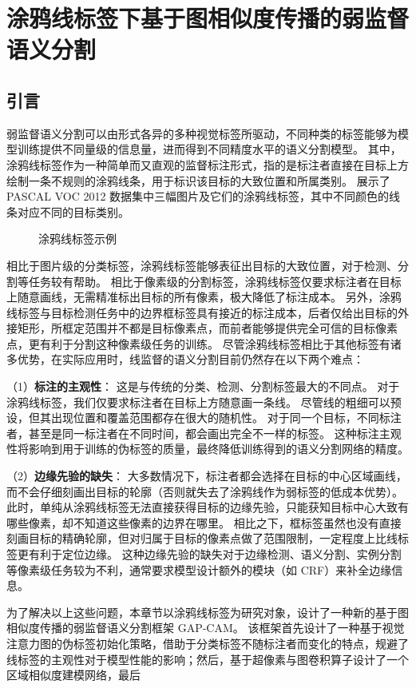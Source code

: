 \chapter{涂鸦线标签下基于图相似度传播的弱监督语义分割}
\section{引言}
弱监督语义分割可以由形式各异的多种视觉标签所驱动，不同种类的标签能够为模型训练提供不同量级的信息量，进而得到不同精度水平的语义分割模型。
其中，涂鸦线标签作为一种简单而又直观的监督标注形式，指的是标注者直接在目标上方绘制一条不规则的涂鸦线条，用于标识该目标的大致位置和所属类别。
展示了 PASCAL VOC 2012 数据集中三幅图片及它们的涂鸦线标签，其中不同颜色的线条对应不同的目标类别。
\par
\begin{figure}[h]
\centering
{}
\hfil
{}
\hfil
{}
\caption{涂鸦线标签示例}
\label{fig:scribble-samples}
\end{figure}
\par
相比于图片级的分类标签，涂鸦线标签能够表征出目标的大致位置，对于检测、分割等任务较有帮助。
相比于像素级的分割标签，涂鸦线标签仅要求标注者在目标上随意画线，无需精准标出目标的所有像素，极大降低了标注成本。
另外，涂鸦线标签与目标检测任务中的边界框标签具有接近的标注成本，后者仅给出目标的外接矩形，所框定范围并不都是目标像素点，而前者能够提供完全可信的目标像素点，更有利于分割这种像素级任务的训练。
尽管涂鸦线标签相比于其他标签有诸多优势，在实际应用时，线监督的语义分割目前仍然存在以下两个难点：
\par
（1）\textbf{标注的主观性}：
这是与传统的分类、检测、分割标签最大的不同点。
对于涂鸦线标签，我们仅要求标注者在目标上方随意画一条线。
尽管线的粗细可以预设，但其出现位置和覆盖范围都存在很大的随机性。
对于同一个目标，不同标注者，甚至是同一标注者在不同时间，都会画出完全不一样的标签。
这种标注主观性将影响到用于训练的伪标签的质量，最终降低训练得到的语义分割网络的精度。
\par
（2）\textbf{边缘先验的缺失}：
大多数情况下，标注者都会选择在目标的中心区域画线，而不会仔细刻画出目标的轮廓（否则就失去了涂鸦线作为弱标签的低成本优势）。
此时，单纯从涂鸦线标签无法直接获得目标的边缘先验，只能获知目标中心大致有哪些像素，却不知道这些像素的边界在哪里。
相比之下，框标签虽然也没有直接刻画目标的精确轮廓，但对归属于目标的像素点做了范围限制，一定程度上比线标签更有利于定位边缘。
这种边缘先验的缺失对于边缘检测、语义分割、实例分割等像素级任务较为不利，通常要求模型设计额外的模块（如 CRF\cite{krahenbuhl2011efficient}）来补全边缘信息。
\par
为了解决以上这些问题，本章节以涂鸦线标签为研究对象，设计了一种新的基于图相似度传播的弱监督语义分割框架 GAP-CAM。
该框架首先设计了一种基于视觉注意力图的伪标签初始化策略，借助于分类标签不随标注者而变化的特点，规避了线标签的主观性对于模型性能的影响；然后，基于超像素与图卷积算子设计了一个区域相似度建模网络，最后
